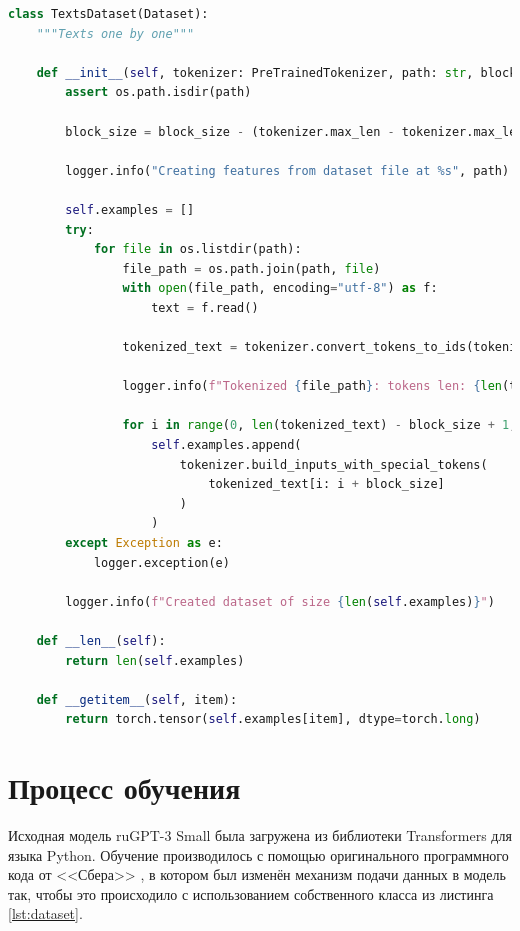 \begin{lstlisting}[language=Python, caption={Класс датасета, хранящий данные в разбитом виде}, label=lst:dataset]
class TextsDataset(Dataset):
    """Texts one by one"""

    def __init__(self, tokenizer: PreTrainedTokenizer, path: str, block_size=2048):
        assert os.path.isdir(path)

        block_size = block_size - (tokenizer.max_len - tokenizer.max_len_single_sentence)

        logger.info("Creating features from dataset file at %s", path)

        self.examples = []
        try:
            for file in os.listdir(path):
                file_path = os.path.join(path, file)
                with open(file_path, encoding="utf-8") as f:
                    text = f.read()

                tokenized_text = tokenizer.convert_tokens_to_ids(tokenizer.tokenize(text))
                
                logger.info(f"Tokenized {file_path}: tokens len: {len(tokenized_text)}")

                for i in range(0, len(tokenized_text) - block_size + 1, block_size):  # Truncate in block of block_size
                    self.examples.append(
                        tokenizer.build_inputs_with_special_tokens(
                            tokenized_text[i: i + block_size]
                        )
                    )
        except Exception as e:
            logger.exception(e)
        
        logger.info(f"Created dataset of size {len(self.examples)}")

    def __len__(self):
        return len(self.examples)

    def __getitem__(self, item):
        return torch.tensor(self.examples[item], dtype=torch.long)
\end{lstlisting}

\section{Процесс обучения}

Исходная модель ruGPT-3 Small была загружена из библиотеки Transformers для языка Python. Обучение производилось с помощью оригинального программного кода от <<Сбера>> \cite{gh:sber}, в котором был изменён механизм подачи данных в модель так, чтобы это происходило с использованием собственного класса  из листинга \ref*{lst:dataset}.

